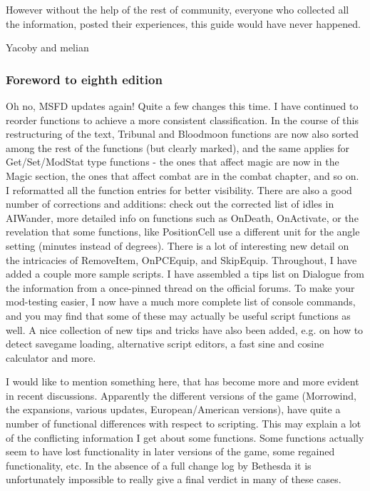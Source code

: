 \documentclass[oneside]{article}
\begin{document}
However without the help of the rest of community, everyone who collected all the information, posted their experiences, this guide would have never happened.

Yacoby and melian

\hypertarget{foreword-to-eighth-edition}{%
\subsubsection{\texorpdfstring{\hfill\break
Foreword to eighth edition}{ Foreword to eighth edition}}\label{foreword-to-eighth-edition}}

Oh no, MSFD updates again! Quite a few changes this time. I have continued to reorder functions to achieve a more consistent classification. In the course of this restructuring of the text, Tribunal and Bloodmoon functions are now also sorted among the rest of the functions (but clearly marked), and the same applies for Get/Set/ModStat type functions - the ones that affect magic are now in the Magic section, the ones that affect combat are in the combat chapter, and so on. I reformatted all the function entries for better visibility. There are also a good number of corrections and additions: check out the corrected list of idles in AIWander, more detailed info on functions such as OnDeath, OnActivate, or the revelation that some functions, like PositionCell use a different unit for the angle setting (minutes instead of degrees). There is a lot of interesting new detail on the intricacies of RemoveItem, OnPCEquip, and SkipEquip. Throughout, I have added a couple more sample scripts. I have assembled a tips list on Dialogue from the information from a once-pinned thread on the official forums. To make your mod-testing easier, I now have a much more complete list of console commands, and you may find that some of these may actually be useful script functions as well. A nice collection of new tips and tricks have also been added, e.g. on how to detect savegame loading, alternative script editors, a fast sine and cosine calculator and more.

I would like to mention something here, that has become more and more evident in recent discussions. Apparently the different versions of the game (Morrowind, the expansions, various updates, European/American versions), have quite a number of functional differences with respect to scripting. This may explain a lot of the conflicting information I get about some functions. Some functions actually seem to have lost functionality in later versions of the game, some regained functionality, etc. In the absence of a full change log by Bethesda it is unfortunately impossible to really give a final verdict in many of these cases.
\end{document}
